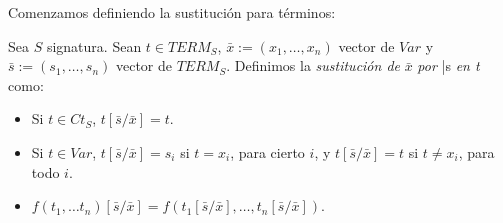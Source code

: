 Comenzamos definiendo la sustitución para términos:

\begin{definition}
Sea $S$ signatura. Sean $t \in TERM_S$, $\bar{x} := (x_1, \dots, x_n)$ vector de $Var$ y $\bar{s} := (s_1, \dots, s_n)$ vector de $TERM_S$. Definimos la \textit{sustitución de} $\bar{x}$ \textit{por} \bar{s} \textit{en t} como:
\begin{itemize}
    \item Si $t \in Ct_S$, $t[\bar{s}/\bar{x}] = t$.
    \item Si $t \in Var$, $t[\bar{s}/\bar{x}] = s_i$ si $t = x_i$, para cierto $i$, y $t[\bar{s}/\bar{x}] = t$ si $t \neq x_i$, para todo $i$.
    \item $f(t_1, \dots t_n)[\bar{s}/\bar{x}] = f(t_1[\bar{s}/\bar{x}], \dots, t_n[\bar{s}/\bar{x}]).$
\end{itemize}
\end{definition}

